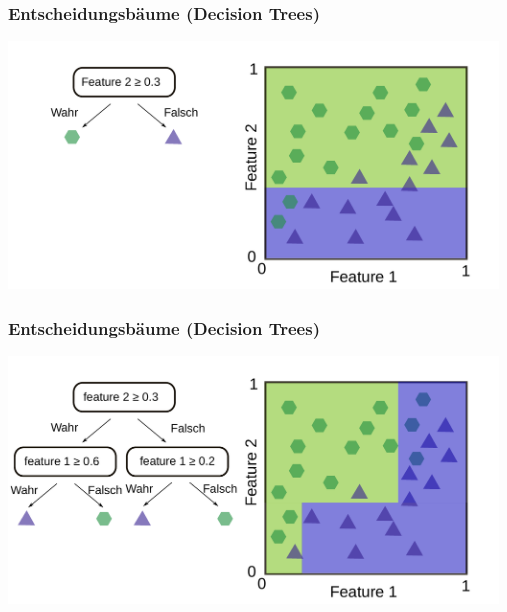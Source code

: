 \documentclass[aspectratio=169]{beamer}
\begin{document}
\begin{frame}
  \frametitle{Entscheidungsbäume (Decision Trees)}
  \begin{center}
    \includegraphics[width=13.0cm]{images/decision_tree_1.pdf}
  \end{center}  
\end{frame}

\begin{frame}
  \frametitle{Entscheidungsbäume (Decision Trees)}
  \begin{center}
    \includegraphics[width=13.0cm]{images/decision_tree_2.pdf}
  \end{center}  
\end{frame}

\end{document}

